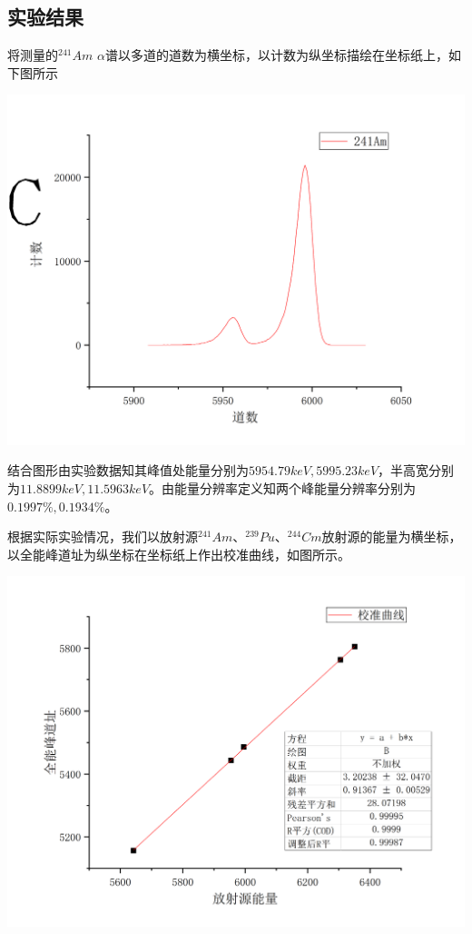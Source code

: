 \documentclass[hyperref]{ctexart}
\begin{document}
\begin{multicols}{2}
	\section{实验结果}
	将测量的$^{241}Am$\hspace{0.5em} $\alpha$谱以多道的道数为横坐标，以计数为纵坐标描绘在坐标纸上，如下图所示
	\begin{center}\includegraphics[scale=0.3]{T1.png}\end{center}
	结合图形由实验数据知其峰值处能量分别为$5954.79keV,5995.23keV$，半高宽分别为$11.8899keV,11.5963keV$。由能量分辨率定义知两个峰能量分辨率分别为$0.1997\%,0.1934\%$。

	根据实际实验情况，我们以放射源$^{241}Am$、$^{239}Pu$、$^{244}Cm$放射源的能量为横坐标，以全能峰道址为纵坐标在坐标纸上作出校准曲线，如图所示。
	\begin{center}\includegraphics[scale=0.3]{T2.png}\end{center}


\end{multicols}
\end{document}
